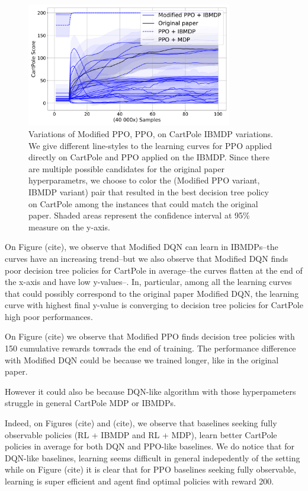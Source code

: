 \begin{figure}
    \centering
    \includegraphics[width=0.8\textwidth]{images/images_part1/ppo.pdf}
    \caption{Variations of Modified PPO, PPO, on CartPole IBMDP variations. We give different line-styles to the learning curves for PPO applied directly on CartPole and PPO applied on the IBMDP.
    Since there are multiple possible candidates for the original paper hyperparametrs, we choose to color the (Modified PPO variant, IBMDP variant) pair that resulted in the best decision tree policy on CartPole among the instances that could match the original paper.
    Shaded areas represent the confidence interval at 95\% measure on the y-axis.}
\end{figure}
On Figure (cite), we observe that Modified DQN can learn in IBMDPs--the curves have an increasing trend--but we also observe that Modified DQN finds poor decision tree policies for CartPole in average--the curves flatten at the end of the x-axis and have low y-values--.
In, particular, among all the learning curves that could possibly correspond to the original paper Modified DQN, the learning curve with highest final y-value is converging to decision tree policies for CartPole high poor performances.

On Figure (cite) we observe that Modified PPO finds decision tree policies with 150 cumulative rewards towrads the end of training. The performance difference with Modified DQN could be because we trained longer, like in the original paper.

However it could also be because DQN-like algorithm with those hyperpameters struggle in general CartPole MDP or IBMDPs.

Indeed, on Figures (cite) and (cite), we observe that baselines seeking fully observable policies (RL + IBMDP and RL + MDP), learn better CartPole policies in average for both DQN and PPO-like baselines. 
We do notice that for DQN-like baselines, learning seems difficult in general indepedently of the setting while on Figure (cite) it is clear that for PPO baselines seeking fully observable, learning is super efficient and agent find optimal policies with reward 200.

